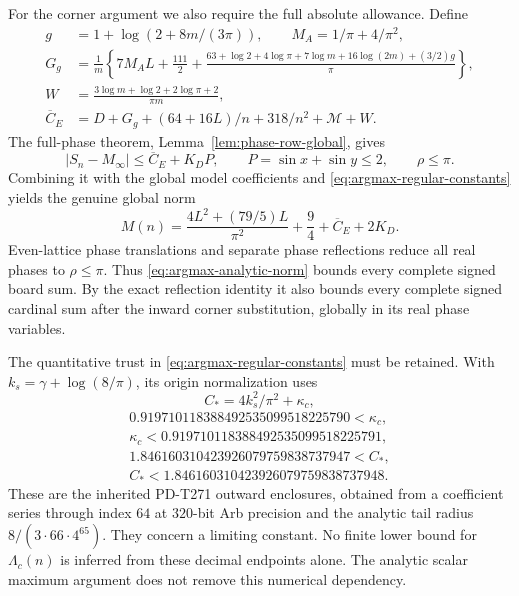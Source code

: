 For the corner argument we also require the full absolute allowance.
Define
\begin{align*}
 g&=1+\log(2+8m/(3\pi)),\qquad M_A=1/\pi+4/\pi^2,\\
 G_g&=\frac1m\left\{7M_A L+\frac{111}2+
 \frac{63+\log2+4\log\pi+7\log m+16\log(2m)+(3/2)g}{\pi}\right\},\\
 W&=\frac{3\log m+\log2+2\log\pi+2}{\pi m},\\
 \overline C_E&=D+G_g+(64+16L)/n+318/n^2+\mathcal M+W.
\end{align*}
The full-phase theorem, Lemma~\ref{lem:phase-row-global}, gives
\begin{equation}
 |S_n-M_\infty|\leq\overline C_E+K_D P,
 \qquad P=\sin x+\sin y\leq2,\qquad \rho\leq\pi.
                                                        \label{eq:argmax-global-error-norm}
\end{equation}
Combining it with the global model coefficients and
\eqref{eq:argmax-regular-constants} yields the genuine global norm
\begin{equation}
 M(n)=\frac{4L^2+(79/5)L}{\pi^2}+\frac94+\overline C_E+2K_D.
                                                        \label{eq:argmax-analytic-norm}
\end{equation}
Even-lattice phase translations and separate phase reflections reduce
all real phases to $\rho\leq\pi$.  Thus \eqref{eq:argmax-analytic-norm}
bounds every complete signed board sum.  By the exact reflection
identity it also bounds every complete signed cardinal sum after the
inward corner substitution, globally in its real phase variables.

The quantitative trust in \eqref{eq:argmax-regular-constants} must be
retained.  With $k_s=\gamma+\log(8/\pi)$, its origin normalization uses
\[
 C_* =4k_s^2/\pi^2+\kappa_c,
\]
\begin{gather*}
 0.919710118388492535099518225790<\kappa_c,\\
 \kappa_c<0.919710118388492535099518225791,\\
 1.846160310423926079759838737947<C_*,\\
 C_*<1.846160310423926079759838737948.
\end{gather*}
These are the inherited PD-T271 outward enclosures, obtained from a
coefficient series through index $64$ at $320$-bit Arb precision and
the analytic tail radius $8/(3\cdot66\cdot4^{65})$.  They concern a
limiting constant.  No finite lower bound for $\Lambda_c(n)$ is inferred
from these decimal endpoints alone.  The analytic scalar maximum
argument does not remove this numerical dependency.

